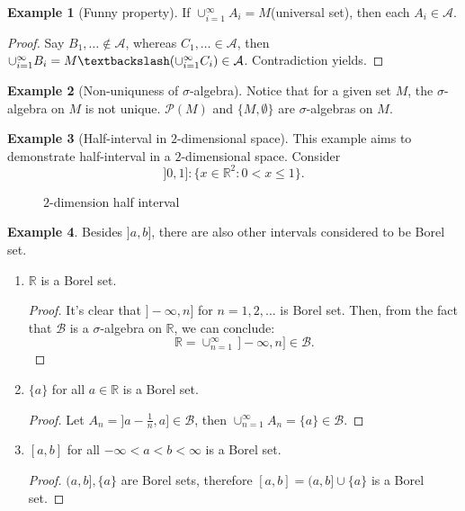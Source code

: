 \documentclass[12pt, a4paper]{article}
\theoremstyle{definition}
\newtheorem{example}{Example}
\newcommand{\union}[2]{\cup_{#1}^{#2}}
\newcommand{\m}[1]{\mathcal{#1}}
\newcommand{\minus}{\textbackslash}
\newcommand{\intersection}[2]{\cup_{#1}^{#2}}
\begin{document}
\begin{example}[Funny property]
If $\union{i=1}{\infty}A_i=M$(universal set), then each $A_i\in\mathcal{A}$.
\begin{proof}
Say $B_1,\dots\notin\m{A}$, whereas $C_1,\dots\in\m{A}$,  then $\union{i=1}{\infty}B_i=M\minus (\union{i=1}{\infty}C_i)\in\m{A}$. Contradiction yields.
\end{proof}
\end{example}

\begin{example}[Non-uniquness of $\sigma$-algebra]
Notice that for a given set $M$, the $\sigma$-algebra on $M$ is not unique. $\m{P}(M)$ and $\{M,\emptyset\}$ are $\sigma$-algebras  on $M$.
\end{example}

\begin{example}[Half-interval in $2$-dimensional space]
This example aims to demonstrate half-interval in a $2$-dimensional space. Consider 
\[
]0,1]:\{x\in\mathbb{R}^2:0<x\leq 1\}.
\]
\begin{figure}[h!]
\centering
{}
\caption{$2$-dimension half interval}
\end{figure}
\end{example}

\begin{example}
Besides $]a,b]$, there are also other intervals considered to be Borel set.
\begin{enumerate}
\item 
$\mathbb{R}$ is a Borel set.
\begin{proof}
It's clear that $]-\infty,n]$ for $n=1,2,\dots$ is Borel set. Then, from the fact that $\m{B}$ is a $\sigma$-algebra on $\mathbb{R}$, we can conclude:
\[
\mathbb{R}=\union{n=1}{\infty}\,]-\infty,n]\in\m{B}.
\]
\end{proof}
\item $\{a\}$ for all $a\in \mathbb{R}$ is a Borel set.
\begin{proof}
Let $A_n = ]a-\frac{1}{n},a]\in\m{B}$, then $\intersection{n=1}{\infty}A_n = \{a\}\in\m{B}$.
\end{proof}
\item $[a,b]$ for all $-\infty<a<b<\infty$ is a Borel set.
\begin{proof}
$(a,b],\{a\}$ are Borel sets, therefore $[a,b] = (a,b]\cup\{a\}$ is a Borel set.
\end{proof}
\end{enumerate}
\end{example}
\end{document}
